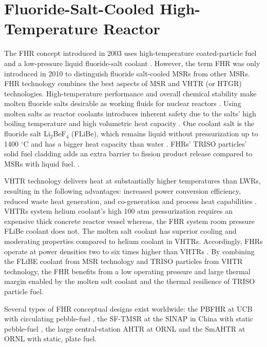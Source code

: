 \section{Fluoride-Salt-Cooled High-Temperature Reactor}
\label{sec:fhr}
The \gls{FHR} concept introduced in 2003 uses high-temperature 
coated-particle fuel and a low-pressure liquid fluoride-salt coolant 
\cite{forsberg_molten-salt-cooled_2003,facilitators_fluoride-salt-cooled_2013}.
However, the term \acrlong{FHR} was only introduced in 2010 to distinguish fluoride 
salt-cooled \glspl{MSR} from other \glspl{MSR}. 
\gls{FHR} technology combines the best aspects of \gls{MSR} and \gls{VHTR} 
(or \gls{HTGR}) technologies. 
High-temperature performance and overall chemical stability make molten 
fluoride salts desirable as working fluids for nuclear reactors
\cite{scarlat_design_2014}.  
Using molten salts as reactor coolants introduces inherent safety due to the 
salts' high boiling temperature and high volumetric heat capacity
\cite{ho_molten_2013}.
One coolant salt is the fluoride salt Li$_2$BeF$_4$ (FLiBe), 
which remains liquid without pressurization up to 1400 $^{\circ}$C and has a bigger 
heat capacity than water \cite{ho_molten_2013,forsberg_fluoride-salt-cooled_2012}. 
FHRs' TRISO particles' solid fuel cladding adds an extra barrier to fission 
product release compared to \glspl{MSR} with liquid fuel.  \cite{ho_molten_2013}.

\gls{VHTR} technology delivers heat at substantially higher temperatures than 
\glspl{LWR}, resulting in the following advantages: increased power conversion 
efficiency, reduced waste heat generation, and co-generation and process heat 
capabilities \cite{scarlat_design_2014}. 
\glspl{VHTR} system helium coolant's high 100 atm pressurization requires 
an expensive thick concrete reactor vessel whereas, the \gls{FHR} system room 
pressure FLiBe coolant does not. 
The molten salt coolant has superior cooling and moderating properties compared 
to helium coolant in \glspl{VHTR}. 
Accordingly, \glspl{FHR} operate at power densities two to six times higher than 
\glspl{VHTR} \cite{scarlat_design_2014,forsberg_fluoride-salt-cooled_2012}.
By combining the FLiBE coolant from \gls{MSR} technology and 
\gls{TRISO} particles from \gls{VHTR} technology, the \gls{FHR} benefits from 
a low operating pressure and large thermal margin enabled by the molten 
salt coolant and the thermal resilience of \gls{TRISO} particle fuel. 

Several types of \gls{FHR} conceptual designs exist worldwide: the \gls{PBFHR} at 
\gls{UCB} with circulating pebble-fuel 
\cite{scarlat_current_2014,krumwiede_three-dimensional_2013}, the \gls{SF-TMSR} 
at the \gls{SINAP} in China with static pebble-fuel \cite{liu_preliminary_2016}, 
the large central-station \gls{AHTR} at \gls{ORNL} \cite{holcomb_core_2011, varma_ahtr_2012} and 
the \gls{SmAHTR} at ORNL \cite{greene_pre-conceptual_2010} with static, plate fuel. 


